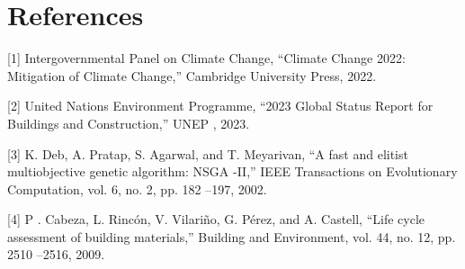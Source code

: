 \documentclass[10pt,twocolumn]{article}
\begin{document}
\section*{References}
\small
[1] Intergovernmental Panel on Climate Change, “Climate Change 2022: Mitigation of Climate
Change,” Cambridge University Press, 2022.  
 
[2] United Nations Environment Programme, “2023 Global Status Report for Buildings and 
Construction,” UNEP , 2023.  
 
[3] K. Deb, A. Pratap, S. Agarwal, and T. Meyarivan, “A fast and elitist multiobjective genetic 
algorithm: NSGA -II,” IEEE Transactions on Evolutionary Computation, vol. 6, no. 2, pp. 182 –197, 2002.  
 
[4] P . Cabeza, L. Rincón, V. Vilariño, G. Pérez, and A. Castell, “Life cycle assessment of building 
materials,” Building and Environment, vol. 44, no. 12, pp. 2510 –2516, 2009.
\end{document}
